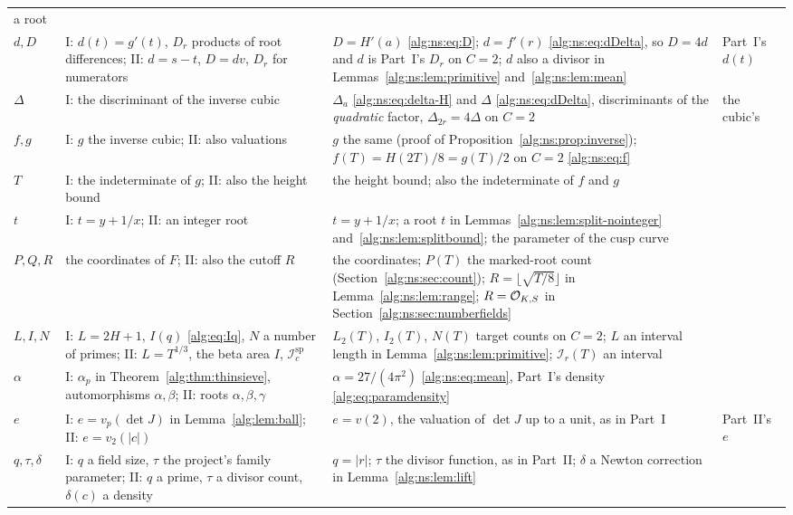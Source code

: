 \documentclass[11pt]{article}
\numberwithin{equation}{section}
\theoremstyle{plain}
\theoremstyle{plain}
\theoremstyle{plain}
\theoremstyle{definition}
\theoremstyle{definition}
\theoremstyle{definition}
\theoremstyle{remark}
\newcommand{\Isplit}{\mathcal I^{\mathrm{sp}}}
\begin{document}
\begin{longtable}{@{}>{\raggedright}p{}>{\raggedright}p{}>{\raggedright}p{}>{\raggedright\arraybackslash}p{}@{}}
a root\\
$d,D$ & I: $d(t)=g'(t)$, $D_r$ products of root differences; II: $d=s-t$,
$D=dv$, $D_r$ for numerators & $D=H'(a)$ \eqref{alg:ns:eq:D};
$d=f'(r)$ \eqref{alg:ns:eq:dDelta}, so $D=4d$ and $d$ is Part~I's $D_r$
on $C=2$; $d$ also a divisor in Lemmas~\ref{alg:ns:lem:primitive}
and~\ref{alg:ns:lem:mean} & Part~I's $d(t)$\\
$\Delta$ & I: the discriminant of the inverse cubic & $\Delta_a$
\eqref{alg:ns:eq:delta-H} and $\Delta$ \eqref{alg:ns:eq:dDelta},
discriminants of the \emph{quadratic} factor, $\Delta_{2r}=4\Delta$ on
$C=2$ & the cubic's\\
$f,g$ & I: $g$ the inverse cubic; II: also valuations & $g$ the same
(proof of Proposition~\ref{alg:ns:prop:inverse}); $f(T)=H(2T)/8=g(T)/2$
on $C=2$ \eqref{alg:ns:eq:f} & \\
$T$ & I: the indeterminate of $g$; II: also the height bound & the height
bound; also the indeterminate of $f$ and $g$ & \\
$t$ & I: $t=y+1/x$; II: an integer root & $t=y+1/x$; a root $t$ in
Lemmas~\ref{alg:ns:lem:split-nointeger} and~\ref{alg:ns:lem:splitbound};
the parameter of the cusp curve & \\
$P,Q,R$ & the coordinates of $F$; II: also the cutoff $R$ &
the coordinates; $P(T)$ the marked-root count
(Section~\ref{alg:ns:sec:count}); $R=\lfloor\sqrt{T/8}\rfloor$ in
Lemma~\ref{alg:ns:lem:range}; $R=\mathcal O_{K,S}$ in
Section~\ref{alg:ns:sec:numberfields} & \\
$L,I,N$ & I: $L=2H+1$, $I(q)$ \eqref{alg:eq:Iq}, $N$ a number of primes;
II: $L=T^{1/3}$, the beta area $I$, $\Isplit_c$ & $L_2(T)$, $I_2(T)$,
$N(T)$ target counts on $C=2$; $L$ an interval length in
Lemma~\ref{alg:ns:lem:primitive}; $\mathcal I_r(T)$ an interval & \\
$\alpha$ & I: $\alpha_p$ in Theorem~\ref{alg:thm:thinsieve}, automorphisms
$\alpha,\beta$; II: roots $\alpha,\beta,\gamma$ & $\alpha=27/(4\pi^2)$
\eqref{alg:ns:eq:mean}, Part~I's density \eqref{alg:eq:paramdensity} & \\
$e$ & I: $e=v_p(\det J)$ in Lemma~\ref{alg:lem:ball}; II: $e=v_2(|c|)$ &
$e=v(2)$, the valuation of $\det J$ up to a unit, as in Part~I &
Part~II's $e$\\
$q,\tau,\delta$ & I: $q$ a field size, $\tau$ the project's family
parameter; II: $q$ a prime, $\tau$ a divisor count, $\delta(c)$ a density
& $q=|r|$; $\tau$ the divisor function, as in Part~II; $\delta$ a Newton
correction in Lemma~\ref{alg:ns:lem:lift} & \\
\end{longtable}
\endgroup
\end{document}
